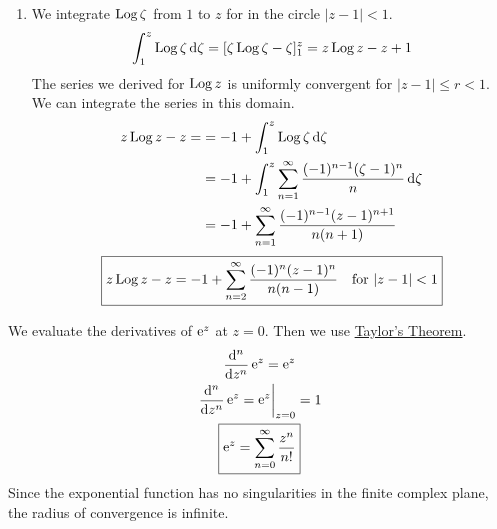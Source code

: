 {\begin{Solution}
\begin{enumerate}
    \[
    \boxed{
      \frac{1}{z^2} = \sum_{n = 0}^\infty (-1)^n (n + 1) (z - 1)^n \quad \mathrm{for}\ |z-1| < 1
      }
    \]      
  \item
    We integrate $\mathop{\mathrm{Log}}\nolimits \zeta$ from $1$ to $z$ for in the circle $|z - 1| < 1$.
    \[
    \int_1^z \mathop{\mathrm{Log}}\nolimits \zeta \,\mathrm{d} \zeta = [ \zeta \mathop{\mathrm{Log}}\nolimits \zeta - \zeta ]_1^z = z \mathop{\mathrm{Log}}\nolimits z - z + 1
    \]
    The series we derived for $\mathop{\mathrm{Log}}\nolimits z$ is uniformly convergent for 
    $|z - 1| \leq r < 1$.  We can integrate the series in this domain.
    \begin{align*}
      z \mathop{\mathrm{Log}}\nolimits z - z = 
      &= -1 + \int_1^z \mathop{\mathrm{Log}}\nolimits \zeta \,\mathrm{d} \zeta
      \\
      &= -1 + \int_1^z \sum_{n = 1}^\infty \frac{ (-1)^{n-1} (\zeta - 1)^n }{ n } \,\mathrm{d} \zeta
      \\
      &= -1 + \sum_{n = 1}^\infty \frac{ (-1)^{n-1} (z - 1)^{n+1} }{ n (n + 1) }
    \end{align*}
    \[
    \boxed{
      z \mathop{\mathrm{Log}}\nolimits z - z = -1 + \sum_{n = 2}^\infty \frac{ (-1)^n (z - 1)^n }{ n (n - 1) }
      \quad \mathrm{for}\ |z - 1| < 1
      }
    \]
  \end{enumerate}
\end{Solution}


\begin{Solution}
  \label{solution taylor exp cos sin}
  We evaluate the derivatives of $\mathop{\mathrm{e}}\nolimits^z$ at $z = 0$. Then we use 
  \hyperref[result taylor theorem]{Taylor's Theorem}.
  \begin{gather*}
    \frac{\mathrm{d}^n}{\mathrm{d} z^n} \mathop{\mathrm{e}}\nolimits^z = \mathop{\mathrm{e}}\nolimits^z
    \\
    \left. \frac{\mathrm{d}^n}{\mathrm{d} z^n} \mathop{\mathrm{e}}\nolimits^z = \mathop{\mathrm{e}}\nolimits^z \right|_{z = 0} = 1
    \\
    \boxed{
      \mathop{\mathrm{e}}\nolimits^z = \sum_{n = 0}^\infty \frac{z^n}{n!}
      }
  \end{gather*}
  Since the exponential function has no singularities in the finite complex
  plane, the radius of convergence is infinite.
  

\end{Solution}}
